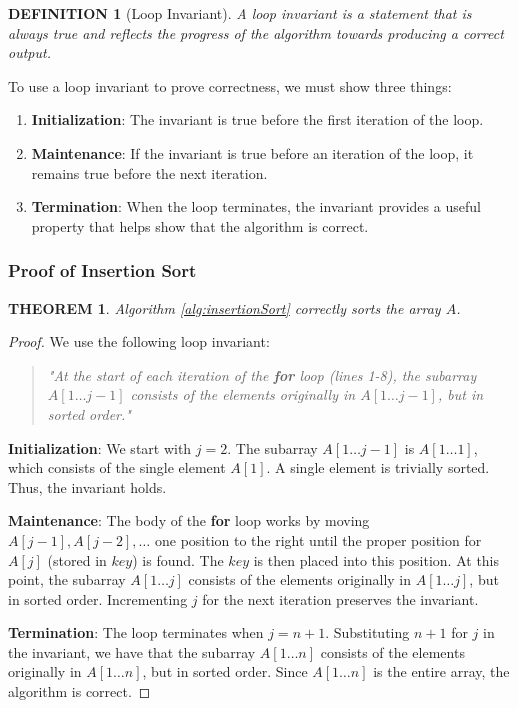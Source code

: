 \documentclass[12pt]{article}
\theoremstyle{blueplain}
\newtheorem{theorem}{THEOREM}[section]
\theoremstyle{bluedef}
\newtheorem{definition}{DEFINITION}[section]
\theoremstyle{blueremark}
\begin{document}
\begin{definition}[Loop Invariant]
    A loop invariant is a statement that is always true and reflects the progress of the algorithm towards producing a correct output.
\end{definition}

To use a loop invariant to prove correctness, we must show three things:
\begin{enumerate}
    \item \textbf{Initialization}: The invariant is true before the first iteration of the loop.
    \item \textbf{Maintenance}: If the invariant is true before an iteration of the loop, it remains true before the next iteration.
    \item \textbf{Termination}: When the loop terminates, the invariant provides a useful property that helps show that the algorithm is correct.
\end{enumerate}

\subsubsection{Proof of Insertion Sort}

\begin{theorem}
    Algorithm \ref{alg:insertionSort} correctly sorts the array $A$.
\end{theorem}

\begin{proof}
    We use the following loop invariant:
    \begin{quote}
        \textit{"At the start of each iteration of the \textbf{for} loop (lines 1-8), the subarray $A[1 \dots j-1]$ consists of the elements originally in $A[1 \dots j-1]$, but in sorted order."}
    \end{quote}

    \noindent \textbf{Initialization}:
    We start with $j=2$. The subarray $A[1 \dots j-1]$ is $A[1 \dots 1]$, which consists of the single element $A[1]$. A single element is trivially sorted. Thus, the invariant holds.

    \noindent \textbf{Maintenance}:
    The body of the \textbf{for} loop works by moving $A[j-1], A[j-2], \dots$ one position to the right until the proper position for $A[j]$ (stored in $key$) is found. The $key$ is then placed into this position.
    At this point, the subarray $A[1 \dots j]$ consists of the elements originally in $A[1 \dots j]$, but in sorted order. Incrementing $j$ for the next iteration preserves the invariant.

    \noindent \textbf{Termination}:
    The loop terminates when $j = n + 1$. Substituting $n+1$ for $j$ in the invariant, we have that the subarray $A[1 \dots n]$ consists of the elements originally in $A[1 \dots n]$, but in sorted order. Since $A[1 \dots n]$ is the entire array, the algorithm is correct.
\end{proof}
\end{document}
